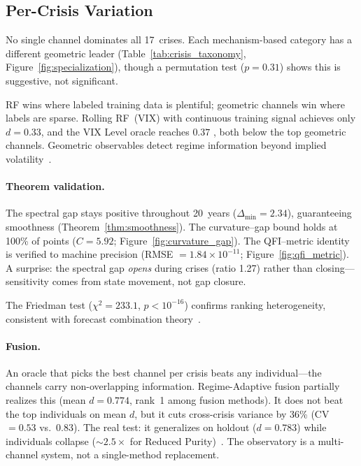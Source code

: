\documentclass[3p]{elsarticle}
\begin{document}
\subsection{Per-Crisis Variation}

No single channel dominates all 17~crises.  Each mechanism-based
category has a different geometric leader
(Table~\ref{tab:crisis_taxonomy}, Figure~\ref{fig:specialization}),
though a permutation test ($p = 0.31$) shows this is suggestive, not
significant.

RF wins where labeled training data is plentiful; geometric channels
win where labels are sparse.  Rolling RF~(VIX) with continuous training
signal achieves only $d = 0.33$, and the VIX Level oracle reaches $0.37$
, both below the top geometric channels.  Geometric observables detect
regime information beyond implied
volatility~\cite{bendavid2010}.

\paragraph{Theorem validation.}
The spectral gap stays positive throughout 20~years
($\Delta_{\min} = 2.34$), guaranteeing smoothness
(Theorem~\ref{thm:smoothness}).  The curvature--gap bound holds at
100\% of points ($C = 5.92$; Figure~\ref{fig:curvature_gap}).  The
QFI--metric identity is verified to machine precision
(RMSE $= 1.84 \times 10^{-11}$; Figure~\ref{fig:qfi_metric}).
A surprise: the spectral gap \emph{opens} during crises (ratio 1.27)
rather than closing---sensitivity comes from state movement, not gap
closure.

The Friedman test ($\chi^2 = 233.1$, $p < 10^{-16}$) confirms
ranking heterogeneity, consistent with forecast combination
theory~\cite{bates_granger1969,timmermann2006}.

\paragraph{Fusion.}
An oracle that picks the best channel per crisis beats any individual---the
channels carry non-overlapping information.  Regime-Adaptive fusion
partially realizes this (mean $d = 0.774$, rank~1 among fusion methods).
It does not beat the top individuals on mean $d$, but it cuts cross-crisis
variance by 36\% (CV $= 0.53$ vs.\ $0.83$).  The real test: it
generalizes on holdout ($d = 0.783$) while individuals collapse
(${\sim}2.5\times$ for Reduced
Purity)~\cite{bates_granger1969,timmermann2006}.
The observatory is a multi-channel system, not a single-method replacement.
\end{document}
